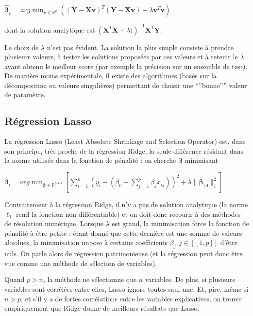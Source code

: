 \documentclass[letterpaper,10pt,french]{sphinxmanual}
\begin{document}
\sphinxAtStartPar
\(\hat{\boldsymbol \beta}_r = arg\displaystyle\min_{\mathbf v\in\mathbb{R}^{p}} \left ((\mathbf Y-\mathbf X\mathbf v)^T(\mathbf Y-\mathbf X\mathbf v) + \lambda \mathbf v^T\mathbf v\right )\)

\sphinxAtStartPar
dont la solution analytique est \((\mathbf X^T\mathbf X + \lambda \mathbb{I})^{-1}\mathbf X^T\mathbf Y\).

\sphinxAtStartPar
Le choix de \(\lambda\) n’est pas évident. La solution la plus simple consiste à prendre plusieurs valeurs, à tester les solutions proposées par ces valeurs et à retenir le \(\lambda\) ayant obtenu le meilleur score (par exemple la précision sur un ensemble de test). De manière moins expérimentale, il existe des algorithmes (basés sur la décomposition en valeurs singulières) permettant de choisir une “”bonne”” valeur de paramètre.


\subsection{Régression Lasso}
\label{\detokenize{regression:regression-lasso}}
\ignorespaces 
{}\ignorespaces 
\sphinxAtStartPar
La régression Lasso (Least Absolute Shrinkage and Selection Operator) est, dans son principe, très proche de la régression Ridge, la seule différence résidant dans la norme utilisée dans la fonction de pénalité : on cherche \(\boldsymbol\beta\) minimisant

\sphinxAtStartPar
\(\boldsymbol\beta_l = arg\displaystyle\min_{\boldsymbol\beta\in\mathbb{R}^{p+1}}\left [\displaystyle\sum_{i=1}^n \left (y_i-(\beta_0+\displaystyle\sum_{j=1}^p \beta_j x_{ij})\right )^2+\lambda \| \boldsymbol\beta_{\setminus 0}\|^2_1\right ]\)

\sphinxAtStartPar
Contrairement à la régression Ridge, il n’y a pas de solution analytique (la norme \(\ell_1\) rend la fonction non différentiable) et on doit donc recourir à des méthodes de résolution numérique. Lorsque \(\lambda\) est grand, la minimisation force la fonction de pénalité à être petite : étant donné que cette dernière est une somme de valeurs absolues, la minimisation impose à certains coefficients \(\beta_j,j\in[\![1,p]\!]\) d’être nuls. On parle alors de régression parcimonieuse (et la régression peut donc être vue comme une méthode de sélection de variables).

\sphinxAtStartPar
Quand \(p>n\), la méthode ne sélectionne que \(n\) variables. De plus, si plusieurs variables sont corrélées entre elles, Lasso ignore toutes sauf une. Et, pire, même si \(n>p\), et s’il y a de fortes corrélations entre les variables explicatives, on trouve empiriquement que Ridge donne de meilleurs résultats que Lasso.
\end{document}
